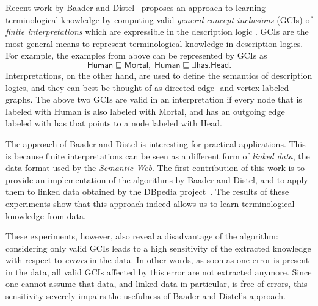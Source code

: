 \documentclass[english,fleqn]{scrartcl}
\begin{document}
Recent work by Baader and Distel~\cite{Diss-Felix} proposes an approach to learning
terminological knowledge by computing valid \emph{general concept inclusions} (GCIs) of
\emph{finite interpretations} which are expressible in the description logic \ELbot.  GCIs
are the most general means to represent terminological knowledge in description logics.
For example, the examples from above can be represented by GCIs as
\begin{equation*}
  \mathsf{Human} \sqsubseteq \mathsf{Mortal}, \; \mathsf{Human} \sqsubseteq \exists
  \mathsf{has}. \mathsf{Head}.
\end{equation*}
Interpretations, on the other hand, are used to define the semantics of description
logics, and they can best be thought of as directed edge- and vertex-labeled graphs.  The
above two GCIs are valid in an interpretation if every node that is labeled with
\textsf{Human} is also labeled with \textsf{Mortal}, and has an outgoing edge labeled with
\textsf{has} that points to a node labeled with \textsf{Head}.

The approach of Baader and Distel is interesting for practical applications.  This is
because finite interpretations can be seen as a different form of \emph{linked data}, the
data-format used by the \emph{Semantic Web}.  The first contribution of this work is to
provide an implementation of the algorithms by Baader and Distel, and to apply them to
linked data obtained by the DBpedia project~\cite{DBpedia}.  The results of these
experiments show that this approach indeed allows us to learn terminological knowledge
from data.

These experiments, however, also reveal a disadvantage of the algorithm: considering only
valid GCIs leads to a high sensitivity of the extracted knowledge with respect to
\emph{errors} in the data.  In other words, as soon as one error is present in the data,
all valid GCIs affected by this error are not extracted anymore.  Since one cannot assume
that data, and linked data in particular, is free of errors, this sensitivity severely
impairs the usefulness of Baader and Distel's approach.



\printbibliography{}
\end{document}
